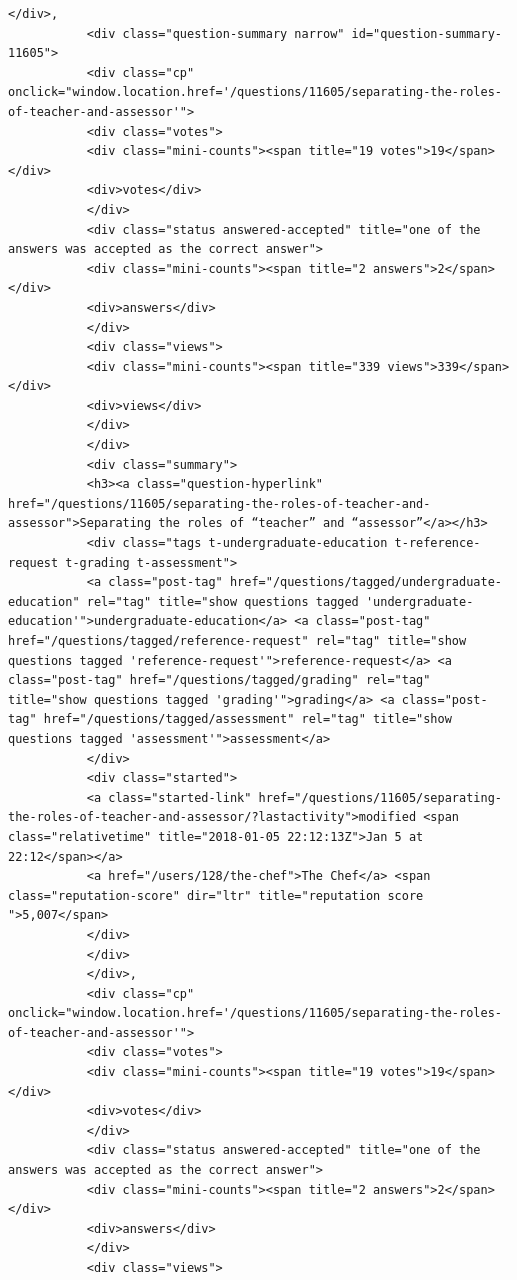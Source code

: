 \documentclass[11pt]{article}
\begin{document}
\begin{Verbatim}[commandchars=\\\{\}]
           </div>,
           <div class="question-summary narrow" id="question-summary-11605">
           <div class="cp" onclick="window.location.href='/questions/11605/separating-the-roles-of-teacher-and-assessor'">
           <div class="votes">
           <div class="mini-counts"><span title="19 votes">19</span></div>
           <div>votes</div>
           </div>
           <div class="status answered-accepted" title="one of the answers was accepted as the correct answer">
           <div class="mini-counts"><span title="2 answers">2</span></div>
           <div>answers</div>
           </div>
           <div class="views">
           <div class="mini-counts"><span title="339 views">339</span></div>
           <div>views</div>
           </div>
           </div>
           <div class="summary">
           <h3><a class="question-hyperlink" href="/questions/11605/separating-the-roles-of-teacher-and-assessor">Separating the roles of “teacher” and “assessor”</a></h3>
           <div class="tags t-undergraduate-education t-reference-request t-grading t-assessment">
           <a class="post-tag" href="/questions/tagged/undergraduate-education" rel="tag" title="show questions tagged 'undergraduate-education'">undergraduate-education</a> <a class="post-tag" href="/questions/tagged/reference-request" rel="tag" title="show questions tagged 'reference-request'">reference-request</a> <a class="post-tag" href="/questions/tagged/grading" rel="tag" title="show questions tagged 'grading'">grading</a> <a class="post-tag" href="/questions/tagged/assessment" rel="tag" title="show questions tagged 'assessment'">assessment</a>
           </div>
           <div class="started">
           <a class="started-link" href="/questions/11605/separating-the-roles-of-teacher-and-assessor/?lastactivity">modified <span class="relativetime" title="2018-01-05 22:12:13Z">Jan 5 at 22:12</span></a>
           <a href="/users/128/the-chef">The Chef</a> <span class="reputation-score" dir="ltr" title="reputation score ">5,007</span>
           </div>
           </div>
           </div>,
           <div class="cp" onclick="window.location.href='/questions/11605/separating-the-roles-of-teacher-and-assessor'">
           <div class="votes">
           <div class="mini-counts"><span title="19 votes">19</span></div>
           <div>votes</div>
           </div>
           <div class="status answered-accepted" title="one of the answers was accepted as the correct answer">
           <div class="mini-counts"><span title="2 answers">2</span></div>
           <div>answers</div>
           </div>
           <div class="views">

\end{Verbatim}
\end{document}
